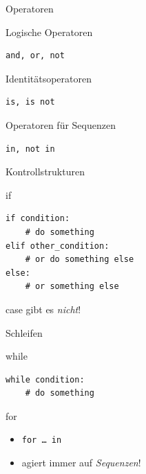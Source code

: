 \begin{frame}[fragile]{Operatoren}
  \begin{spacing}{1.0}
    \begin{block}{Logische Operatoren}
      \begin{verbatim}
and, or, not
      \end{verbatim}
    \end{block}
    \begin{block}{Identitätsoperatoren}
      \begin{verbatim}
is, is not
      \end{verbatim}
    \end{block}
    \begin{block}{Operatoren für Sequenzen}
      \begin{verbatim}
in, not in
      \end{verbatim}
    \end{block}
  \end{spacing}
\end{frame}

\begin{frame}[fragile]{Kontrollstrukturen}
  \begin{spacing}{1.0}
    \begin{block}{if}
      \begin{verbatim}
if condition:
    # do something
elif other_condition:
    # or do something else
else:
    # or something else
      \end{verbatim}
    \end{block}
    \begin{block}{case}
      gibt es \emph{nicht}!
    \end{block}
  \end{spacing}
\end{frame}

\begin{frame}[fragile]{Schleifen}
  \begin{block}{while}
    \begin{verbatim}
while condition:
    # do something
    \end{verbatim}
  \end{block}
  \begin{block}{for}
  \begin{itemize}
   \item \texttt{for … in}
   \item agiert immer auf \emph{Sequenzen}!
  \end{itemize}
  \end{block}
\end{frame}

